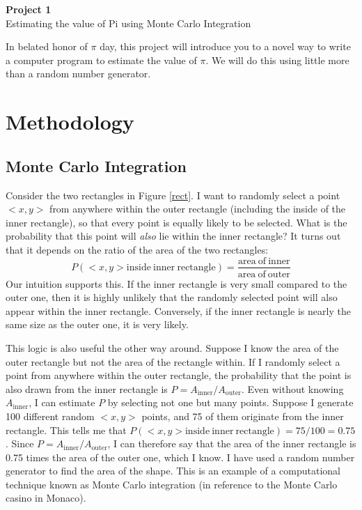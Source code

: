 \documentclass{article}
\begin{document}
\fancyfoot[C]{\thepage}
\vspace*{0cm}
\begin{center}
	{\LARGE \textbf{Project 1}}\\
	\vspace{.25cm}
	{\Large Estimating the value of Pi using Monte Carlo Integration}
\end{center}

In belated honor of $\pi$ day, this project will introduce you to a novel way to write a computer program to estimate the value of $\pi$. We will do this using little more than a random number generator.

\section*{Methodology}
\subsection*{Monte Carlo Integration}
Consider the two rectangles in Figure \ref{rect}. I want to randomly select a point $<x,y>$ from anywhere within the outer rectangle (including the inside of the inner rectangle), so that every point is equally likely to be selected. What is the probability that this point will \textit{also} lie within the inner rectangle? It turns out that it depends on the ratio of the area of the two rectangles:
\begin{equation*}
P(<x,y> \mathrm{inside\ inner\ rectangle})=\frac{\mathrm{area\ of\ inner}}{\mathrm{area\ of\ outer}}
\end{equation*}
Our intuition supports this. If the inner rectangle is very small compared to the outer one, then it is highly unlikely that the randomly selected point will also appear within the inner rectangle. Conversely, if the inner rectangle is nearly the same size as the outer one, it is very likely.

This logic is also useful the other way around. Suppose I know the area of the outer rectangle but not the area of the rectangle within. If I randomly select a point from anywhere within the outer rectangle, the probability that the point is also drawn from the inner rectangle is $P=A_\mathrm{inner}/A_\mathrm{outer}$. Even without knowing $A_\mathrm{inner}$, I can estimate $P$ by selecting not one but many points. Suppose I generate 100 different random $<x,y>$ points, and 75 of them originate from the inner rectangle. This tells me that $P(<x,y> \mathrm{inside\ inner\ rectangle})=75/100=0.75$. Since $P=A_\mathrm{inner}/A_\mathrm{outer}$, I can therefore say that the area of the inner rectangle is 0.75 times the area of the outer one, which I know. I have used a random number generator to find the area of the shape. This is an example of a computational technique known as Monte Carlo integration (in reference to the Monte Carlo casino in Monaco).
\end{document}
